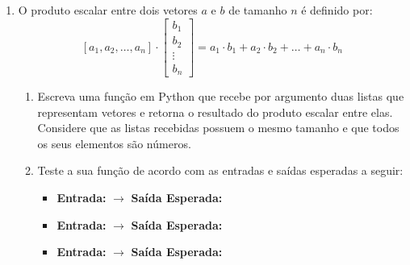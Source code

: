 \begin{enumerate}[label=\textbf{Q\arabic*.}]
    \item O produto escalar entre dois vetores $a$ e $b$ de tamanho $n$ é definido por:
    \[
    [a_{1}, a_{2}, \dots, a_{n}] \cdot 
    \begin{bmatrix}
    b_{1} \\
    b_{2} \\
    \vdots \\
    b_{n}
    \end{bmatrix}
    = a_{1} \cdot b_{1} + a_{2} \cdot b_{2} + \dots + a_{n} \cdot b_{n}
    \]
    \begin{enumerate}[label=\alph*)]
        \item Escreva uma função em Python que recebe por argumento duas listas que representam vetores e retorna o resultado do produto escalar entre elas. Considere que as listas recebidas possuem o mesmo tamanho e que todos os seus elementos são números.
        \item Teste a sua função de acordo com as entradas e saídas esperadas a seguir:
        \begin{itemize}
            \item \textbf{Entrada:}  $\rightarrow$ \textbf{Saída Esperada:} 
            \item \textbf{Entrada:}  $\rightarrow$ \textbf{Saída Esperada:} 
            \item \textbf{Entrada:}  $\rightarrow$ \textbf{Saída Esperada:} 
        \end{itemize}
    \end{enumerate}

    \vspace{0.5cm}
    


\end{enumerate}
